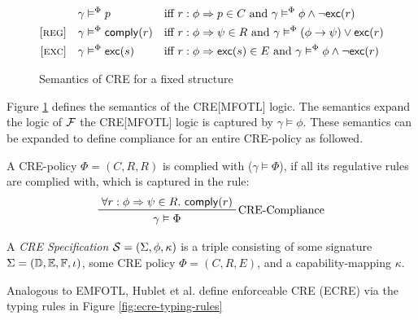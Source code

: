 \begin{figure}
    \begin{align*}
        [\textsc{con}] &&
            \gamma &\vDash^\Phi p &&
            \text{iff } r:\phi \Rightarrow p \in C
            \text{ and }\gamma \vDash^\Phi \phi \wedge \neg \exc(r) \\
        [\textsc{reg}] &&
            \gamma &\vDash^\Phi \comply(r) &&
            \text{iff } r:\phi \Rightarrow \psi \in R
            \text{ and }\gamma \vDash^\Phi (\phi \to \psi) \vee \exc(r)\\
        [\textsc{exc}] &&
            \gamma &\vDash^\Phi \exc(s) &&
            \text{iff } r:\phi \Rightarrow \exc(s) \in E
            \text{ and }\gamma \vDash^\Phi \phi \wedge \neg \exc(r)
    \end{align*}
    \vspace{-2em}
    \caption{Semantics of CRE for a fixed structure\label{fig:cre-semantics} \cite[Figure 5]{lex}}
\end{figure}

Figure \ref{fig:cre-semantics} defines the semantics of the CRE[MFOTL] logic.
The semantics expand the logic of $\mathcal{F}$ the CRE[MFOTL] logic
is captured by $\gamma \vDash \phi$.
These semantics can be expanded to define compliance for an entire CRE-policy as followed.
\begin{definition}
    \label{cre-compliance}
    A CRE-policy $\Phi = \left(C,R,R \right)$ is complied with ($\gamma \vDash \Phi$), if
    all its regulative rules are complied with, which is captured in the rule:
    \begin{equation*}
        \prftree[r]{CRE-Compliance}
            {\forall r: \phi \Rightarrow \psi \in R.\ \comply(r)}
            {\gamma \vDash \Phi}
    \end{equation*}
\end{definition}

\begin{definition}
    \label{def:cre-specification}
    A \emph{CRE Specification} 
    $\mathcal{S} = \left(\Sigma, \phi, \kappa \right)$
    is a triple consisting of some signature
    $\Sigma = \left(\mathbb{D}, \mathbb{E}, \mathbb{F}, \iota \right)$,
    some CRE policy
    $\Phi = \left(C, R, E\right)$,
    and a capability-mapping $\kappa$.
\end{definition}

Analogous to EMFOTL, Hublet et al. \cite{lex} define enforceable
CRE (ECRE)
via the typing rules in Figure \ref{fig:ecre-typing-rules}

